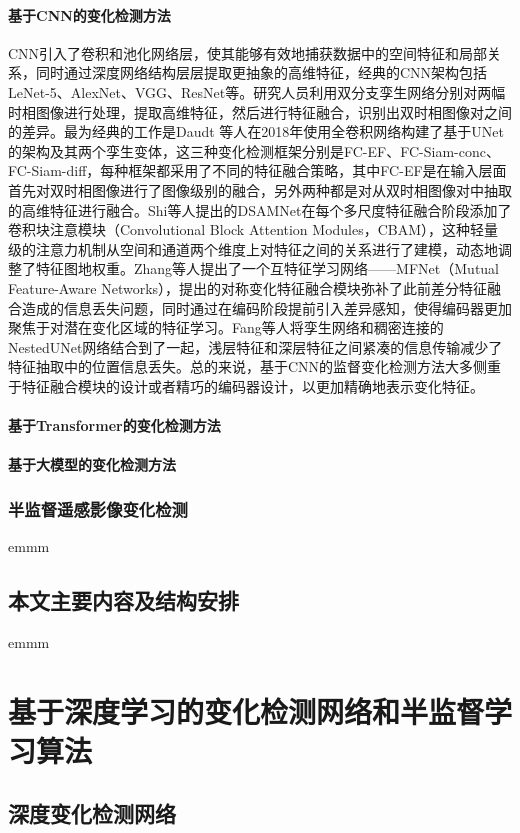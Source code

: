 \documentclass[lang=chs, degree=master, blindreview=false, adobe=false]{yanputhesis}
\begin{document}
\subsubsection{基于CNN的变化检测方法}
CNN引入了卷积和池化网络层，使其能够有效地捕获数据中的空间特征和局部关系，同时通过深度网络结构层层提取更抽象的高维特征，经典的CNN架构包括LeNet-5、AlexNet、VGG、ResNet等。研究人员利用双分支孪生网络分别对两幅时相图像进行处理，提取高维特征，然后进行特征融合，识别出双时相图像对之间的差异。最为经典的工作是Daudt 等人\cite{daudt2018FC-EF}在2018年使用全卷积网络构建了基于UNet的架构及其两个孪生变体，这三种变化检测框架分别是FC-EF、FC-Siam-conc、FC-Siam-diff，每种框架都采用了不同的特征融合策略，其中FC-EF是在输入层面首先对双时相图像进行了图像级别的融合，另外两种都是对从双时相图像对中抽取的高维特征进行融合。Shi等人\cite{shi2021DSAMNet}提出的DSAMNet在每个多尺度特征融合阶段添加了卷积块注意模块（Convolutional Block Attention Modules，CBAM），这种轻量级的注意力机制从空间和通道两个维度上对特征之间的关系进行了建模，动态地调整了特征图地权重。Zhang等人\cite{zhang2023MFNet}提出了一个互特征学习网络——MFNet（Mutual Feature-Aware Networks），提出的对称变化特征融合模块弥补了此前差分特征融合造成的信息丢失问题，同时通过在编码阶段提前引入差异感知，使得编码器更加聚焦于对潜在变化区域的特征学习。Fang等人将孪生网络和稠密连接的NestedUNet网络结合到了一起，浅层特征和深层特征之间紧凑的信息传输减少了特征抽取中的位置信息丢失。总的来说，基于CNN的监督变化检测方法大多侧重于特征融合模块的设计或者精巧的编码器设计，以更加精确地表示变化特征。
\subsubsection{基于Transformer的变化检测方法}
\subsubsection{基于大模型的变化检测方法}
\subsection{半监督遥感影像变化检测}
emmm
\section{本文主要内容及结构安排}
emmm
\chapter{基于深度学习的变化检测网络和半监督学习算法}
\section{深度变化检测网络}
\end{document}

